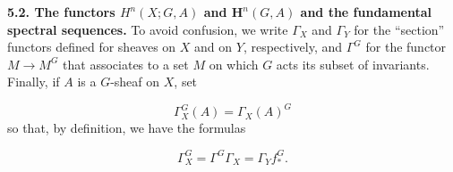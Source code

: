 \bigskip
\textbf{5.2. The functors $H^n(X;G,A)$ and $\mathbf H^n(G,A)$ and the
fundamental spectral sequences.}
To avoid confusion, we write $\Gamma_X$ and $\Gamma_Y$ for the ``section''
functors defined for sheaves on $X$ and on $Y$, respectively, and $\Gamma^G$
for the functor $M\to M^G$ that associates to a set $M$ on which $G$
acts its subset of invariants. Finally, if $A$ is a $G$-sheaf on $X$, set

\[
\Gamma_X^G(A)=\Gamma_X(A)^G
\tag{5.2.1}
\]
so that, by definition, we have the formulas

\[
\Gamma_X^G=\Gamma^G\Gamma_X=\Gamma_Yf_*^G.
\tag{5.2.2}
\]


